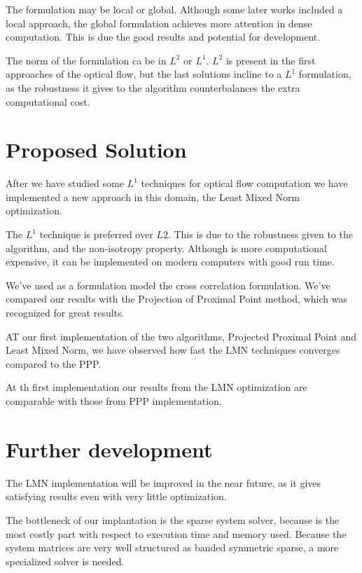 \documentclass[12pt,a4paper,twoside]{report}
\begin{document}
{The formulation may be local or global. Although some later works included a local approach, the global formulation achieves more attention in dense computation. This is due the good results and potential for development.

The norm of the formulation ca be in $L^2$ or $L^1$. $L^2$ is present in the first approaches of the optical flow, but the last solutions incline to a $L^1$ formulation, as the robustness it gives to the algorithm counterbalances the extra computational cost.

\section{Proposed Solution}

After we have studied some $L^1$ techniques for optical flow computation we have implemented a new approach in this domain, the Least Mixed Norm optimization.

The $L^1$ technique is preferred over $L2$. This is due to the robustness given to the algorithm, and the non-isotropy property. Although is more computational expensive, it can be implemented on modern computers with good run time.  

 We've used as a formulation model the cross correlation formulation. We've compared our results with the Projection of Proximal Point method, which was recognized for great results.
 
 AT our first implementation of the two algorithms, Projected Proximal Point and Least Mixed Norm, we have observed how fast the LMN techniques converges compared to the PPP.
 
 At th first implementation our results from the LMN optimization are comparable with those from PPP implementation. 

 


\section{Further development}

 
 The LMN implementation will be improved in the near future, as it gives satisfying results even with very little optimization. 
 
 The bottleneck of our implantation is the sparse system solver, because is the most costly part with respect to execution time and memory used. Because the system matrices are very well structured as banded symmetric sparse, a more specialized solver is needed.
 
}
\end{document}
